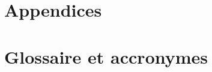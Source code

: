 \chapter{Appendices} \label{appendix}

\listoffigures
\listoftables

\chapter{Glossaire et accronymes}
\glsaddall
\printglossary
\printglossary[type=\acronymtype]
